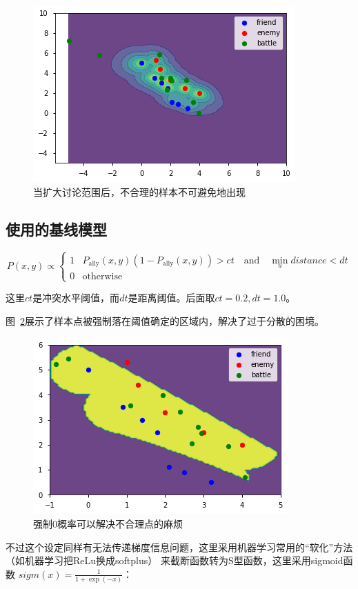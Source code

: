 \documentclass{sicnuthesis}
\begin{document}
\begin{figure}[htb]
\includegraphics[width=0.6\linewidth]{comb4.png}
\caption{
当扩大讨论范围后，不合理的样本不可避免地出现}
\label{fig:combThree}
\end{figure}

\subsection{使用的基线模型}

$$
P(x,y) \propto
\begin{cases}
1 & P_\text{ally}(x,y) (1-P_\text{ally}(x,y)) > ct \quad \text{and} \quad \min_{u} distance < dt \\
0 & \text{otherwise}
\end{cases}
$$

这里$ct$是冲突水平阈值，而$dt$是距离阈值。后面取$ct=0.2,dt=1.0$。

图~\ref{fig:combFive}展示了样本点被强制落在阈值确定的区域内，解决了过于分散的困境。

\begin{figure}[htb]
\includegraphics[width=0.6\linewidth]{comb5.png}
\caption{
强制0概率可以解决不合理点的麻烦}
\label{fig:combFive}
\end{figure}


不过这个设定同样有无法传递梯度信息问题，这里采用机器学习常用的“软化”方法（如机器学习把ReLu换成softplus）
来截断函数转为S型函数，这里采用sigmoid函数 $sigm(x) = \frac{1}{1+\exp(-x)}$：
\end{document}
